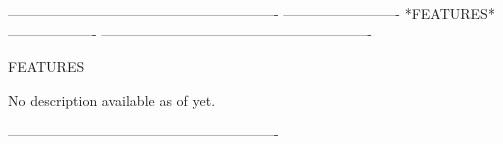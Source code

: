  
 
 
 
 
 
 
 
 
 
 
 
 
 
 
 
 
 
 
 
 
 
 
 
 
 
 
 
 
 
 
 
 
 
 
 
 
 
 
 
 
 
----------------------------------------------------------
-------------------------  *FEATURES*  -------------------
----------------------------------------------------------
 
FEATURES
 
No description available as of yet.
 
----------------------------------------------------------
 
 
 
 
 
 
 
 
 
 
 
 
 
 
 
 
 
 
 
 
 
 
 
 
 
 
 
 
 
 
 
 
 
 
 
 
 
 
 
 
 
 
 
 
 
 
 
 
 
 
 
 
 
 
 
 
 
